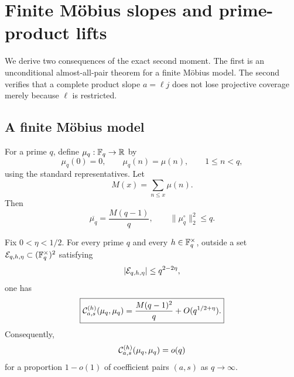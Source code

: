 \section{Finite M\"obius slopes and prime-product lifts}
\label{sec:tpc33-mobius-corollaries}

We derive two consequences of the exact second moment.  The first is an
unconditional almost-all-pair theorem for a finite M\"obius model.  The
second verifies that a complete product slope \(a=\ell j\) does not lose
projective coverage merely because \(\ell\) is restricted.

\subsection{A finite M\"obius model}

For a prime \(q\), define \(\mu_q:\mathbb F_q\to\mathbb R\) by
\begin{equation}
 \mu_q(0)=0,\qquad
 \mu_q(n)=\mu(n),\qquad 1\le n<q,
 \label{eq:tpc33-finite-mobius-model}
\end{equation}
using the standard representatives.  Let
\begin{equation}
 M(x)=\sum_{n\le x}\mu(n).
 \label{eq:tpc33-Mertens-function}
\end{equation}
Then
\begin{equation}
 \overline{\mu_q}=\frac{M(q-1)}q,
 \qquad
 \|\mu_q^\circ\|_2^2\le q.
 \label{eq:tpc33-mobius-mean-energy}
\end{equation}

\begin{theorem}
\label{thm:tpc33-mobius-almost-all-slopes}
Fix \(0<\eta<1/2\).  For every prime \(q\) and every
\(h\in\mathbb F_q^\times\), outside a set
\(\mathcal E_{q,h,\eta}\subset(\mathbb F_q^\times)^2\) satisfying
\begin{equation}
 |\mathcal E_{q,h,\eta}|\le q^{2-2\eta},
 \label{eq:tpc33-mobius-exception-set}
\end{equation}
one has
\begin{equation}
 \boxed{
 \mathcal C_{a,s}^{(h)}(\mu_q,\mu_q)
 =\frac{M(q-1)^2}{q}+O(q^{1/2+\eta}).}
 \label{eq:tpc33-mobius-almost-all-formula}
\end{equation}
Consequently,
\begin{equation}
 \mathcal C_{a,s}^{(h)}(\mu_q,\mu_q)=o(q)
 \label{eq:tpc33-mobius-almost-all-cancellation}
\end{equation}
for a proportion \(1-o(1)\) of coefficient pairs \((a,s)\) as
\(q\to\infty\).
\end{theorem}

